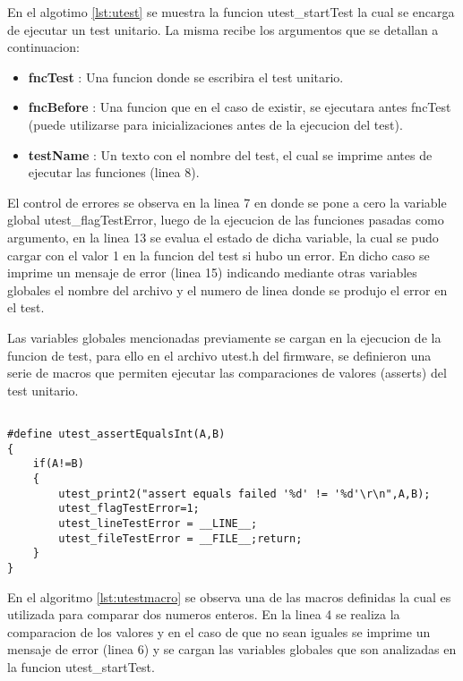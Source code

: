 En el algotimo \ref{lst:utest} se muestra la funcion utest\_startTest la cual se encarga de ejecutar un test unitario. La misma recibe los argumentos que se detallan a continuacion:

\begin{itemize}
	\item \textbf{fncTest} : Una funcion donde se escribira el test unitario.
	\item \textbf{fncBefore} : Una funcion que en el caso de existir, se ejecutara antes fncTest (puede utilizarse para inicializaciones antes de la ejecucion del test).
	\item \textbf{testName} : Un texto con el nombre del test, el cual se imprime antes de ejecutar las funciones (linea 8).	
\end{itemize}
	
El control de errores se observa en la linea 7 en donde se pone a cero la variable global utest\_flagTestError, luego de la ejecucion de las funciones pasadas como argumento, en la linea 13 se evalua el estado de dicha variable, la cual se pudo cargar con el valor 1 en la funcion del test si hubo un error. En dicho caso se imprime un mensaje de error (linea 15) indicando mediante otras variables globales el nombre del archivo y el numero de linea donde se produjo el error en el test.

Las variables globales mencionadas previamente se cargan en la ejecucion de la funcion de test, para ello en el archivo utest.h del firmware, se definieron una serie de macros que permiten ejecutar las comparaciones de valores (asserts) del test unitario.

\begin{lstlisting}[label={lst:utestmacro},caption=Ejemplo de una macro assert incluida en el archivo utest.h del firmware.]

#define utest_assertEqualsInt(A,B)	
{ 
	if(A!=B)
	{ 
		utest_print2("assert equals failed '%d' != '%d'\r\n",A,B); 
		utest_flagTestError=1; 
		utest_lineTestError = __LINE__;  
		utest_fileTestError = __FILE__;return; 
	} 
}
\end{lstlisting}

En el algoritmo \ref{lst:utestmacro} se observa una de las macros definidas la cual es utilizada para comparar dos numeros enteros. En la linea 4 se realiza la comparacion de los valores y en el caso de que no sean iguales se imprime un mensaje de error (linea 6) y se cargan las variables globales que son analizadas en la funcion utest\_startTest.


